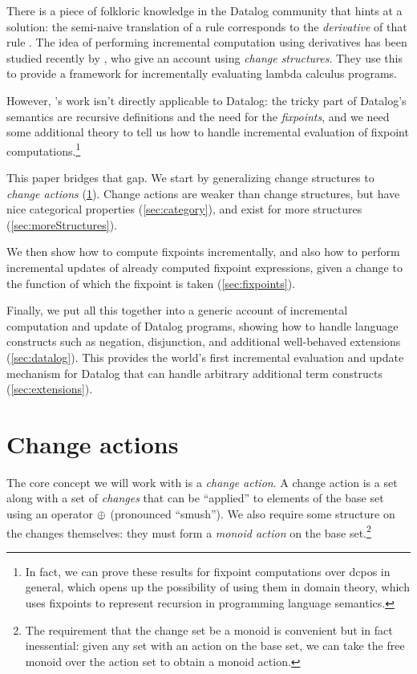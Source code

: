 There is a piece of folkloric knowledge in the Datalog community that hints at a
solution: the semi-naive translation of a rule corresponds to the
\emph{derivative} of that rule \autocites{bancilhon1986naive}[section
3.2.2]{bancilhon1986amateur}. The idea of performing incremental computation using derivatives has been
studied recently by \textcite{cai2014changes}, who give an account using
\emph{change structures}. They use this to provide a framework for incrementally evaluating lambda calculus programs.

However, \citeauthor{cai2014changes}'s work isn't directly applicable to Datalog: the tricky part
of Datalog's semantics are recursive definitions and the need for the \emph{fixpoints}, and we need some additional theory to tell us how to
handle incremental evaluation of fixpoint computations.\footnote{In fact, we can prove these
results for fixpoint computations over dcpos in general, which opens up the
possibility of using them in domain theory, which uses fixpoints to
represent recursion in programming language semantics.}

This paper bridges that gap. We start by generalizing change structures to
\emph{change actions} (\cref{sec:changeActions}). Change actions are weaker than change structures, but
have nice categorical properties (\cref{sec:category}), and exist for more structures (\cref{sec:moreStructures}).

We then show how to compute fixpoints incrementally, and also how to perform
incremental updates of already computed fixpoint expressions, given a change to
the function of which the fixpoint is taken (\cref{sec:fixpoints}).

Finally, we put all this together into a generic account of incremental
computation and update of Datalog programs, showing how to handle 
language constructs such as negation, disjunction, and additional well-behaved
extensions (\cref{sec:datalog}). This provides the world's first incremental
evaluation and update mechanism for Datalog that can handle arbitrary additional
term constructs (\cref{sec:extensions}).

\section{Change actions}
\label{sec:changeActions}

The core concept we will work with is a \emph{change action}. A change action is
a set along with a set of \emph{changes} that can be ``applied'' to elements of
the base set using an operator $\oplus$ (pronounced ``smush''). We also require
some structure on the changes themselves: they must form a \emph{monoid action}
on the base set.\footnote{The requirement that the change set be a monoid is convenient but in
  fact inessential: given any set with an action on the base set, we can take the
  free monoid over the action set to obtain a monoid action.}

